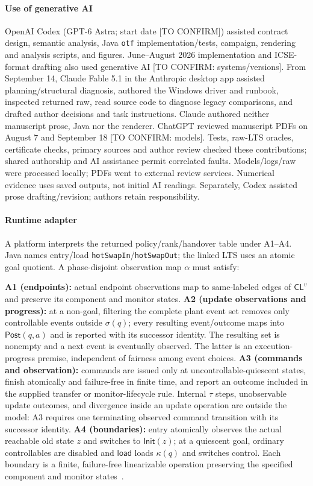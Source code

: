 \documentclass[acmsmall,screen,review,anonymous]{acmart}
\newcommand{\Post}{\mathsf{Post}}
\newcommand{\Init}{\mathsf{Init}}
\begin{document}
\paragraph{Use of generative AI}
OpenAI Codex (GPT-6 Astra; start date [TO CONFIRM]) assisted contract design, semantic analysis, Java \texttt{otf} implementation/tests, campaign, rendering and analysis scripts, and figures. June--August 2026 implementation and ICSE-format drafting also used generative AI [TO CONFIRM: systems/versions]. From September 14, Claude Fable 5.1 in the Anthropic desktop app assisted planning/structural diagnosis, authored the Windows driver and runbook, inspected returned raw, read source code to diagnose legacy comparisons, and drafted author decisions and task instructions. Claude authored neither manuscript prose, Java nor the renderer. ChatGPT reviewed manuscript PDFs on August 7 and September 18 [TO CONFIRM: models]. Tests, raw-LTS oracles, certificate checks, primary sources and author review checked these contributions; shared authorship and AI assistance permit correlated faults. Models/logs/raw were processed locally; PDFs went to external review services. Numerical evidence uses saved outputs, not initial AI readings. Separately, Codex assisted prose drafting/revision; authors retain responsibility.

\paragraph{Runtime adapter}
A platform interprets the returned policy/rank/handover table under A1--A4. Java names entry/load \texttt{hotSwapIn}/\texttt{hotSwapOut}; the linked LTS uses an atomic goal quotient. A phase-disjoint observation map $\alpha$ must satisfy:

\noindent\textbf{A1 (endpoints):} actual endpoint observations map to same-labeled edges of $\mathsf{CL}^v$ and preserve its component and monitor states.
\textbf{A2 (update observations and progress):} at a non-goal, filtering the complete plant event set removes only controllable events outside $\sigma(q)$; every resulting event/outcome maps into $\Post(q,a)$ and is reported with its successor identity. The resulting set is nonempty and a next event is eventually observed. The latter is an execution-progress premise, independent of fairness among event choices.
\textbf{A3 (commands and observation):} commands are issued only at uncontrollable-quiescent states, finish atomically and failure-free in finite time, and report an outcome included in the supplied transfer or monitor-lifecycle rule. Internal $\tau$ steps, unobservable update outcomes, and divergence inside an update operation are outside the model: A3 requires one terminating observed command transition with its successor identity.
\textbf{A4 (boundaries):} entry atomically observes the actual reachable old state $z$ and switches to $\Init(z)$; at a quiescent goal, ordinary controllables are disabled and $\mathsf{load}$ loads $\kappa(q)$ and switches control. Each boundary is a finite, failure-free linearizable operation preserving the specified component and monitor states~\cite{HerlihyWing1990}.
\end{document}
